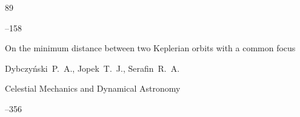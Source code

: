 \begin{thebibliography}{89}

–158






\paper On the minimum distance between two Keplerian orbits with a common focus

\by Dybczy\'nski~P.~A., Jopek~T.~J., Serafin~R.~A.

\jour Celestial Mechanics and Dynamical Astronomy




--356






\end{thebibliography}





\EngDate	

\newpage

\Russian



%

%